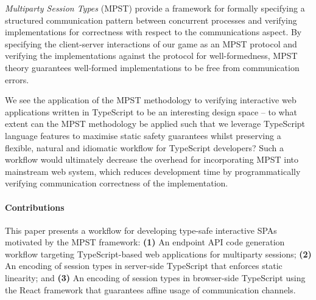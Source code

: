 \textit{Multiparty Session Types} (MPST) \cite{MPST} provide a framework for
formally specifying a structured communication pattern between concurrent
processes and verifying implementations for correctness with respect to the
communications aspect.
By specifying the client-server interactions of our game as an MPST protocol
and verifying the implementations against the protocol for well-formedness,
MPST theory guarantees well-formed implementations to be free from
communication errors.

We see the application of the MPST methodology to verifying interactive web
applications written in TypeScript to be an interesting design space -- to what
extent can the MPST methodology be applied such that we leverage TypeScript
language features to maximise static safety guarantees whilst preserving a
flexible, natural and idiomatic workflow for TypeScript developers?
Such a workflow would ultimately decrease the overhead for incorporating MPST
into mainstream web system, which reduces development time by programmatically
verifying communication correctness of the implementation.

\paragraph{Contributions}
This paper presents a workflow for developing type-safe interactive SPAs
motivated by the MPST framework:
\textbf{(1)} An endpoint API code generation
workflow targeting TypeScript-based web applications for multiparty sessions;
\textbf{(2)} An encoding of session types in server-side TypeScript that
enforces static linearity;
and \textbf{(3)} An encoding of session types in
browser-side TypeScript using the React framework that guarantees affine usage
of communication channels.


